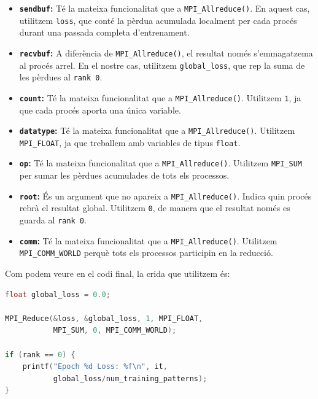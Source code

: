 \documentclass{article}
\begin{document}
\begin{itemize}

    \item \textbf{\texttt{sendbuf}:}
    Té la mateixa funcionalitat que a \texttt{MPI\_Allreduce()}.
    En aquest cas, utilitzem \texttt{loss}, que conté
    la pèrdua acumulada localment per cada procés durant
    una passada completa d'entrenament.

    \item \textbf{\texttt{recvbuf}:}
    A diferència de \texttt{MPI\_Allreduce()}, el resultat
    només s'emmagatzema al procés arrel.
    En el nostre cas, utilitzem \texttt{global\_loss},
    que rep la suma de les pèrdues al \texttt{rank 0}.

    \item \textbf{\texttt{count}:}
    Té la mateixa funcionalitat que a \texttt{MPI\_Allreduce()}.
    Utilitzem \texttt{1}, ja que cada procés aporta
    una única variable.

    \item \textbf{\texttt{datatype}:}
    Té la mateixa funcionalitat que a \texttt{MPI\_Allreduce()}.
    Utilitzem \texttt{MPI\_FLOAT}, ja que treballem
    amb variables de tipus \texttt{float}.

    \item \textbf{\texttt{op}:}
    Té la mateixa funcionalitat que a \texttt{MPI\_Allreduce()}.
    Utilitzem \texttt{MPI\_SUM} per sumar les pèrdues
    acumulades de tots els processos.

    \item \textbf{\texttt{root}:}
    És un argument que no apareix a \texttt{MPI\_Allreduce()}.
    Indica quin procés rebrà el resultat global.
    Utilitzem \texttt{0}, de manera que el resultat
    només es guarda al \texttt{rank 0}.

    \item \textbf{\texttt{comm}:}
    Té la mateixa funcionalitat que a \texttt{MPI\_Allreduce()}.
    Utilitzem \texttt{MPI\_COMM\_WORLD} perquè
    tots els processos participin en la reducció.

\end{itemize}


\medskip

Com podem veure en el codi final, la crida
que utilitzem és:

\begin{lstlisting}[language=C]
float global_loss = 0.0;

MPI_Reduce(&loss, &global_loss, 1, MPI_FLOAT,
           MPI_SUM, 0, MPI_COMM_WORLD);

if (rank == 0) {
    printf("Epoch %d Loss: %f\n", it,
           global_loss/num_training_patterns);
}
\end{lstlisting}
\end{document}
